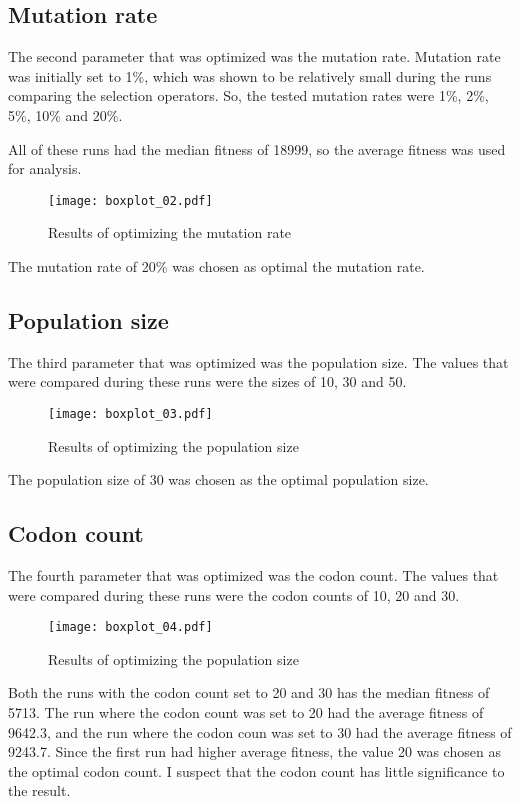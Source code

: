 \subsection{Mutation rate}
The second parameter that was optimized was the mutation rate. Mutation rate was initially set to 1\%, which was shown to be relatively small during the runs comparing the selection operators. So, the tested mutation rates were 1\%, 2\%, 5\%, 10\% and 20\%.

All of these runs had the median fitness of 18999, so the average fitness was used for analysis.

\begin{figure}[H]
	\centering
	\texttt{[image: boxplot\_02.pdf]}
	\caption{Results of optimizing the mutation rate}
\end{figure}

The mutation rate of 20\% was chosen as optimal the mutation rate.

\subsection{Population size}
The third parameter that was optimized was the population size. The values that were compared during these runs were the sizes of 10, 30 and 50.

\begin{figure}[H]
	\centering
	\texttt{[image: boxplot\_03.pdf]}
	\caption{Results of optimizing the population size}
\end{figure}

The population size of 30 was chosen as the optimal population size.

\subsection{Codon count}
The fourth parameter that was optimized was the codon count. The values that were compared during these runs were the codon counts of 10, 20 and 30.

\begin{figure}[H]
	\centering
	\texttt{[image: boxplot\_04.pdf]}
	\caption{Results of optimizing the population size}
\end{figure}

Both the runs with the codon count set to 20 and 30 has the median fitness of 5713. The run where the codon count was set to 20 had the average fitness of 9642.3, and the run where the codon coun was set to 30 had the average fitness of 9243.7. Since the first run had higher average fitness, the value 20 was chosen as the optimal codon count. I suspect that the codon count has little significance to the result.

